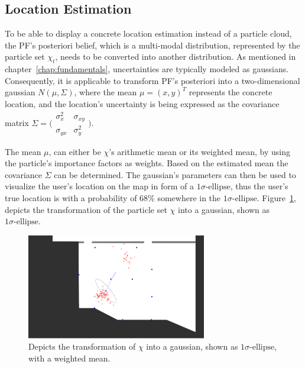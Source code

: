 \subsection{Location Estimation}
To be able to display a concrete location estimation instead of a particle cloud, the \acs{PF}'s posteriori belief, which is a multi-modal distribution, represented by the particle set $\chi_t$, needs to be converted into another distribution. As mentioned in chapter~\ref{chap:fundamentals}, uncertainties are typically modeled as gaussians. Consequently, it is applicable to transform \acs{PF}'s posteriori into a two-dimensional gaussian $N(\mu, \Sigma)$, where the mean $\mu = (x, y)^T$ represents the concrete location, and the location's uncertainty is being expressed as the covariance matrix $\Sigma = \bigl(\begin{smallmatrix} \sigma_{x}^2&\sigma_{xy}\\ \sigma_{yx}&\sigma_{y}^2 \end{smallmatrix} \bigr)$.

The mean $\mu$, can either be $\chi$'s arithmetic mean or its weighted mean, by using the particle's importance factors as weights. Based on the estimated mean the covariance $\Sigma$ can be determined. The gaussian's parameters can then be used to visualize the user's location on the map in form of a $1\sigma\text{-ellipse}$, thus the user's true location is with a probability of $68\%$ somewhere in the $1\sigma\text{-ellipse}$. Figure~\ref{fig:algo_sigellipse}, depicts the transformation of the particle set $\chi$ into a gaussian, shown as $1\sigma\text{-ellipse}$.

\begin{figure}
	\includegraphics[width=0.7\textwidth]{figures/sigellipse}
	\caption{Depicts the transformation of $\chi$ into a gaussian, shown as $1\sigma\text{-ellipse}$, with a weighted mean.}
	\label{fig:algo_sigellipse}
\end{figure}
